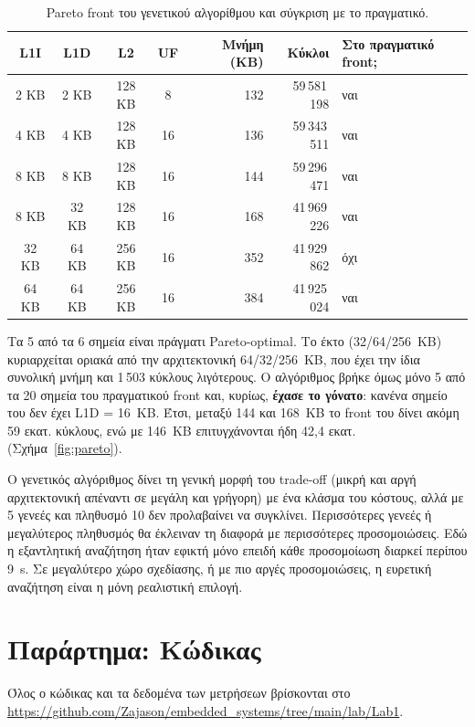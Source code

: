 \documentclass[11pt,a4paper]{article}
\begin{document}
\begin{table}[H]
\centering
\caption{Pareto front του γενετικού αλγορίθμου και σύγκριση με το πραγματικό.}
\label{tab:ga}
\begin{tabular}{@{}ccccrrl@{}}
\toprule
L1I & L1D & L2 & UF & Μνήμη (KB) & Κύκλοι & Στο πραγματικό front; \\
\midrule
2 KB  & 2 KB  & 128 KB & 8  & 132 & 59\,581\,198 & ναι \\
4 KB  & 4 KB  & 128 KB & 16 & 136 & 59\,343\,511 & ναι \\
8 KB  & 8 KB  & 128 KB & 16 & 144 & 59\,296\,471 & ναι \\
8 KB  & 32 KB & 128 KB & 16 & 168 & 41\,969\,226 & ναι \\
32 KB & 64 KB & 256 KB & 16 & 352 & 41\,929\,862 & όχι \\
64 KB & 64 KB & 256 KB & 16 & 384 & 41\,925\,024 & ναι \\
\bottomrule
\end{tabular}
\end{table}

Τα 5 από τα 6 σημεία είναι πράγματι Pareto-optimal. Το έκτο (32/64/256~KB) κυριαρχείται
οριακά από την αρχιτεκτονική 64/32/256~KB, που έχει την ίδια συνολική μνήμη και 1\,503 κύκλους
λιγότερους. Ο αλγόριθμος βρήκε όμως μόνο 5 από τα 20 σημεία του πραγματικού front και, κυρίως,
\textbf{έχασε το γόνατο}: κανένα σημείο του δεν έχει L1D = 16~KB. Έτσι, μεταξύ 144 και 168~KB
το front του δίνει ακόμη 59 εκατ. κύκλους, ενώ με 146~KB επιτυγχάνονται ήδη 42,4 εκατ.
(Σχήμα~\ref{fig:pareto}).

Ο γενετικός αλγόριθμος δίνει τη γενική μορφή του trade-off (μικρή και αργή αρχιτεκτονική
απέναντι σε μεγάλη και γρήγορη) με ένα κλάσμα του κόστους, αλλά με 5 γενεές και πληθυσμό 10
δεν προλαβαίνει να συγκλίνει. Περισσότερες γενεές ή μεγαλύτερος πληθυσμός θα έκλειναν τη
διαφορά με περισσότερες προσομοιώσεις. Εδώ η εξαντλητική αναζήτηση ήταν εφικτή μόνο επειδή
κάθε προσομοίωση διαρκεί περίπου 9~s. Σε μεγαλύτερο χώρο σχεδίασης, ή με πιο αργές
προσομοιώσεις, η ευρετική αναζήτηση είναι η μόνη ρεαλιστική επιλογή.

\section*{Παράρτημα: Κώδικας}

Όλος ο κώδικας και τα δεδομένα των μετρήσεων βρίσκονται στο\\
\url{https://github.com/Zajason/embedded_systems/tree/main/lab/Lab1}.
\end{document}
